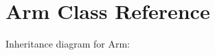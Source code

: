 \hypertarget{classArm}{}\section{Arm Class Reference}
\label{classArm}


Inheritance diagram for Arm\+:
